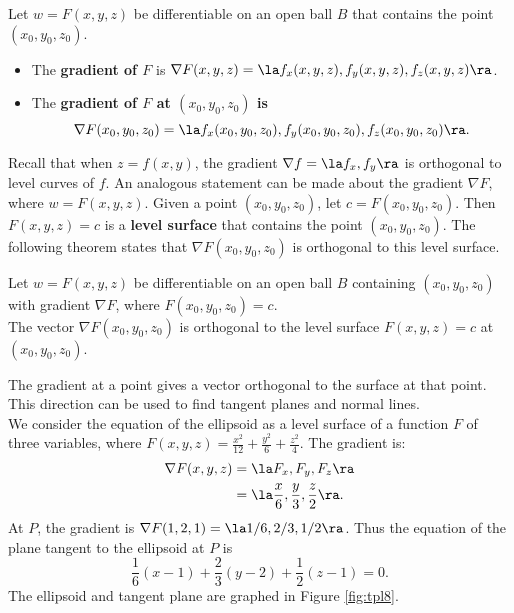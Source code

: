 {Let $w=F(x,y,z)$ be differentiable on an open ball $B$ that contains the point $(x_0,y_0,z_0)$.
\begin{itemize}
	\item The \textbf{gradient of $F$} is $\nabla F(x,y,z) = \la f_x(x,y,z),f_y(x,y,z),f_z(x,y,z)\ra$.
	\item The \textbf{gradient of $F$ at $(x_0,y_0,z_0)$ is $$\nabla F(x_0,y_0,z_0) = \la f_x(x_0,y_0,z_0),f_y(x_0,y_0,z_0),f_z(x_0,y_0,z_0)\ra.$$}
\end{itemize}
\baselineskip
}

Recall that when $z=f(x,y)$, the gradient $\nabla f = \la f_x,f_y\ra$ is orthogonal to level curves of $f$. An analogous statement can be made about the gradient $\nabla F$, where $w= F(x,y,z)$. Given a point $(x_0,y_0,z_0)$, let $c = F(x_0,y_0,z_0)$. Then $F(x,y,z) = c$ is a \textbf{level surface} that contains the point $(x_0,y_0,z_0)$. The following theorem states that $\nabla F(x_0,y_0,z_0)$ is orthogonal to this level surface.

{Let $w=F(x,y,z)$ be differentiable on an open ball $B$ containing $(x_0,y_0,z_0)$ with gradient $\nabla F$, where $F(x_0,y_0,z_0) = c$. \\

The vector $\nabla F(x_0,y_0,z_0)$ is orthogonal to the level surface $F(x,y,z)=c$ at $(x_0,y_0,z_0)$.
}

The gradient at a point gives a vector orthogonal to the surface at that point. This direction can be used to find tangent planes and normal lines.\\

{We consider the equation of the ellipsoid as a level surface of a function $F$ of three variables, where $F(x,y,z) = \frac{x^2}{12} +\frac{y^2}{6}+\frac{z^2}{4}$.  The gradient is:
\begin{align*}
\nabla F(x,y,z) &= \la F_x, F_y,F_z\ra \\
			&= \la \frac x6, \frac y3, \frac z2\ra.
\end{align*}
At  $P$, the gradient is $\nabla F(1,2,1) = \la 1/6, 2/3, 1/2\ra$. Thus the equation of the plane tangent to the ellipsoid at $P$ is
$$\frac 16(x-1) + \frac23(y-2) + \frac 12(z-1) = 0.$$
The ellipsoid and tangent plane are graphed in Figure \ref{fig:tpl8}.
}\\

